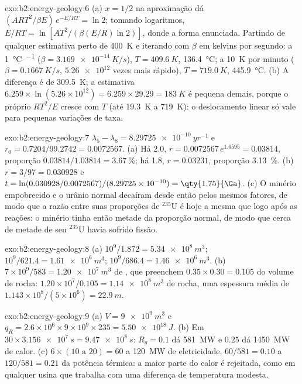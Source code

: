 \begin{solution}{exo:b2:energy-geology:6}
(a) $x = 1/2$ na aproximação dá $(ART^2/\beta E)\,e^{-E/RT} = \ln 2$; tomando logaritmos,
$E/RT = \ln[AT^2/(\beta(E/R)\ln 2)]$, donde a forma enunciada. Partindo de qualquer estimativa perto de
\qty{400}{K} e iterando com $\beta$ em kelvins por segundo: a \qty{1}{\celsius\per\Myr}
($\beta = \qty{3.169e-14}{K/s}$), $T = \qty{409.6}{K}$, \qty{136.4}{\celsius}; a \qty{10}{K} por
minuto ($\beta = \qty{0.1667}{K/s}$, $\num{5.26e12}$ vezes mais rápido), $T = \qty{719.0}{K}$,
\qty{445.9}{\celsius}. (b) A diferença é de \qty{309.5}{K}; a estimativa $6.259 \times
\ln(5.26 \times 10^{12}) = 6.259 \times 29.29 = \qty{183}{K}$ é pequena demais, porque o próprio $RT^2/E$
cresce com $T$ (até \qty{19.3}{K} a \qty{719}{K}): o deslocamento linear só vale para pequenas
variações de taxa.
\end{solution}

\begin{solution}{exo:b2:energy-geology:7}
$\lambda_5 - \lambda_8 = \qty{8.29725e-10}{yr^{-1}}$ e $r_0 = 0.7204/99.2742 = 0.0072567$.
(a) Há \qty{2.0}{\Ga}, $r = 0.0072567\,e^{1.6595} = 0.03814$, proporção $0.03814/1.03814 =
\qty{3.67}{\percent}$; há \qty{1.8}{\Ga}, $r = 0.03231$, proporção \qty{3.13}{\percent}. (b) $r =
3/97 = 0.030928$ e $t = \ln(0.030928/0.0072567)/(8.29725 \times 10^{-10}) = \qty{1.75}{\Ga}$.
(c) O minério empobrecido e o urânio normal decaíram desde então pelos mesmos fatores, de modo que a razão entre
suas proporções de $^{235}$U é hoje a mesma que logo após as reações: o minério tinha então metade da
proporção normal, de modo que cerca de metade de seu $^{235}$U havia sofrido fissão.
\end{solution}

\begin{solution}{exo:b2:energy-geology:8}
(a) $10^9/1.872 = \qty{5.34e8}{m^3}$; $10^9/621.4 = \qty{1.61e6}{m^3}$; $10^9/686.4 =
\qty{1.46e6}{m^3}$. (b) $7 \times 10^9/583 = \qty{1.20e7}{m^3}$ de , que preenchem
$0.35 \times 0.30 = 0.105$ do volume de rocha: $1.20 \times 10^7/0.105 = \qty{1.14e8}{m^3}$ de rocha,
uma espessura média de $1.143 \times 10^8/(5 \times 10^6) = \qty{22.9}{m}$.
\end{solution}

\begin{solution}{exo:b2:energy-geology:9}
(a) $V = \qty{9e9}{m^3}$ e $q_R = 2.6 \times 10^6 \times 9 \times 10^9 \times 235 =
\qty{5.50e18}{J}$. (b) Em $30 \times \qty{3.156e7}{s} = \qty{9.47e8}{s}$: $R_g = 0.1$ dá
\qty{581}{MW} e $0.25$ dá \qty{1450}{MW} de calor. (c) $6 \times (10 \text{ a } 20) = 60$ a
\qty{120}{MW} de eletricidade, $60/581 = 0.10$ a $120/581 = 0.21$ da potência térmica: a maior parte do
calor é rejeitada, como em qualquer usina que trabalha com uma diferença de temperatura modesta.
\end{solution}


